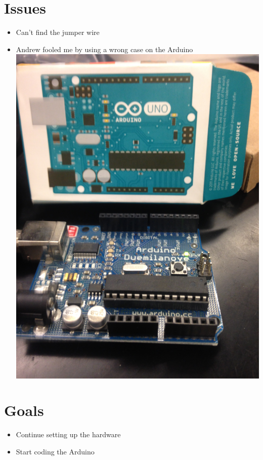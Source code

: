 \documentclass{article}
\begin{document}
\section{Issues}
\begin{itemize}
\item Can't find the jumper wire
\item Andrew fooled me by using a wrong case on the Arduino \\
\includegraphics[scale=0.1,angle=-90]{IMG_2845.JPG} 
\end{itemize}
\section{Goals}
\begin{itemize}
\item Continue setting up the hardware
\item Start coding the Arduino
\end{itemize}

\end{document}
